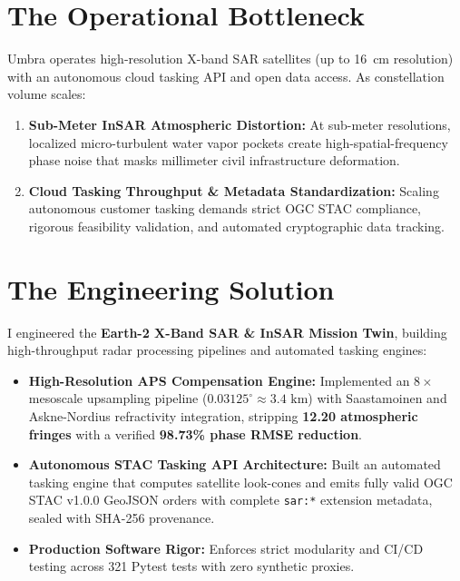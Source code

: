 \documentclass[10pt,letterpaper]{article}
\begin{document}
\noindent
\begin{minipage}[t]{0.51\textwidth}
    \section*{The Operational Bottleneck}
    \footnotesize
    Umbra operates high-resolution X-band SAR satellites (up to 16~cm resolution) with an autonomous cloud tasking API and open data access. As constellation volume scales:
    \begin{enumerate}[leftmargin=12pt,topsep=1pt,itemsep=1pt,parsep=0pt]
        \item \textbf{Sub-Meter InSAR Atmospheric Distortion:} At sub-meter resolutions, localized micro-turbulent water vapor pockets create high-spatial-frequency phase noise that masks millimeter civil infrastructure deformation.
        \item \textbf{Cloud Tasking Throughput & Metadata Standardization:} Scaling autonomous customer tasking demands strict OGC STAC compliance, rigorous feasibility validation, and automated cryptographic data tracking.
    \end{enumerate}

    \section*{The Engineering Solution}
    \footnotesize
    I engineered the \textbf{Earth-2 X-Band SAR & InSAR Mission Twin}, building high-throughput radar processing pipelines and automated tasking engines:
    \begin{itemize}[leftmargin=12pt,topsep=1pt,itemsep=1pt,parsep=0pt]
        \item \textbf{High-Resolution APS Compensation Engine:} Implemented an $8\times$ mesoscale upsampling pipeline ($0.03125^\circ \approx 3.4\text{ km}$) with Saastamoinen and Askne-Nordius refractivity integration, stripping \textbf{12.20 atmospheric fringes} with a verified \textbf{98.73\% phase RMSE reduction}.
        \item \textbf{Autonomous STAC Tasking API Architecture:} Built an automated tasking engine that computes satellite look-cones and emits fully valid OGC STAC v1.0.0 GeoJSON orders with complete \texttt{sar:*} extension metadata, sealed with SHA-256 provenance.
        \item \textbf{Production Software Rigor:} Enforces strict modularity and CI/CD testing across 321 Pytest tests with zero synthetic proxies.
    \end{itemize}


\end{minipage}
\end{document}
